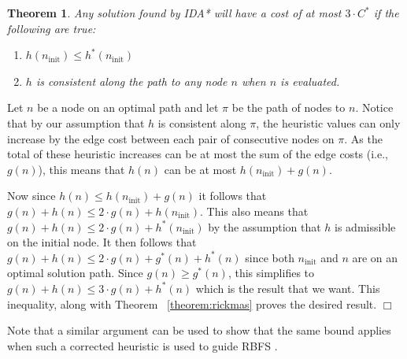 \documentclass[letterpaper]{article}
\newtheorem{theorem}{Theorem}
\newenvironment{proof}{\par\noindent{\em Proof.}}{\hfill $\Box$\medskip}
\begin{document}
\begin{theorem}
Any solution found by IDA* will have a cost of at most $3 \cdot C^*$ if the following are true:
\begin{enumerate}
    \item $h(n_{\mathrm{init}}) \leq h^*(n_{\mathrm{init}})$
    \item $h$ is consistent along the path to any node $n$ when $n$ is evaluated.
\end{enumerate}
\label{the:h_increase_policy}
\end{theorem}
\begin{proof}
%
Let $n$ be a node on an optimal path %
and let $\pi$ be the path of nodes to $n$.
Notice that by our assumption that $h$ is consistent along $\pi$, the heuristic values can only increase by the edge cost between each pair of consecutive nodes on $\pi$.
As the total of these heuristic increases can be at most the sum of the edge costs (i.e., $g(n)$), this means that $h(n)$ can be at most $h(n_{\mathrm{init}}) + g(n)$.

Now since $h(n) \leq h(n_{\mathrm{init}}) + g(n)$ it follows that $g(n) + h(n) \leq 2 \cdot g(n) + h(n_{\mathrm{init}})$. This also means that $g(n) + h(n) \leq 2 \cdot g(n) + h^*(n_{\mathrm{init}})$ by the assumption that $h$ is admissible on the initial node.
It then follows that $g(n) + h(n) \leq 2 \cdot g(n) + g^*(n) + h^*(n)$ since
both $n_{\mathrm{init}}$ and $n$ are on an optimal solution path.
Since $g(n) \geq g^*(n)$, this simplifies to $g(n) + h(n) \leq 3 \cdot g(n) + h^*(n)$ which is the result that we want. This inequality, along with Theorem
~\ref{theorem:rickmas}
proves the desired result.
\end{proof}

Note that a similar argument can be used to show that the same bound applies when such a corrected heuristic is used to guide RBFS \cite{Korf1992}.
\end{document}
